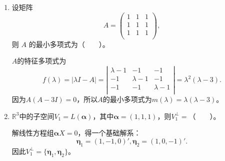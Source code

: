 \begin{enumerate}[1~]
\begin{enumerate}[1.~]
\begin{remark}
接下来回到以上命题：

\begin{proof}
把$A$看成复矩阵，据 \eqref{fujuzhenxiangsiyuduijiaozhen} 得，$A \sim B$，其中$B$是上三角矩阵，$B$的主对角元为$\lambda_1, \lambda_2, \dots, \lambda_n$。据 \eqref{bansuiduijiaohua} 得，$A^* \sim B^*$。直接计算可得\[
B ^ { * } = \left( \begin{array} { c c c c } { \lambda _ { 2 } \lambda _ { 3 } \cdots \lambda _ { n } } & { c _ { 12 } } & { \cdots } & { c _ { 1 n } } \\ { 0 } & { \lambda _ { 1 } \lambda _ { 3 } \cdots \lambda _ { n } } & { \cdots } & { c _ { 2 n } } \\ { \vdots } & { \vdots } & { } & { \vdots } \\ { 0 } & { 0 } & { \cdots } & { \lambda _ { 1 } \lambda _ { 2 } \cdots \lambda _ { n - 1 } } \end{array} \right). \]
由于$|\lambda I -A^*| = |\lambda I -B^*|$，因此$A^*$的特征多项式在复数域中的全部根是：\[
\lambda _ { 2 } \lambda _ { 3 } \cdots \lambda _ { n } ,  \lambda _ { 1 } \lambda _ { 3 } \cdots \lambda _ { n } ,  \dots ,  \lambda _ { 1 } \lambda _ { 2 } \cdots \lambda _ { n - 1 }. \]
\end{proof}
\end{remark}

\item
设矩阵
$$
A = \left( \begin{matrix}
1&  1&  1\\
1&  1&  1\\
1&  1&  1\\
\end{matrix} \right),
$$
则 $A$ 的最小多项式为（\ \ \ \ ）。

\begin{solution}
$A$的特征多项式为\[
f(\lambda)=|\lambda I-A|=\left| \begin{matrix}
	\lambda -1&		-1&		-1\\
	-1&		\lambda -1&		-1\\
	-1&		-1&		\lambda -1\\
\end{matrix} \right|=\lambda ^2\left( \lambda -3 \right).
\]
因为$A(A-3I)=0$，所以$A$的最小多项式为$m(\lambda)=\lambda(\lambda-3)$。
\end{solution}

\item
$\mathbb{R}^3$中的子空间$V_1 =L(\boldsymbol{\alpha})$，其中$\boldsymbol{\alpha} =\left(1,1,1\right)$，则$V_1^{\bot} = $（\ \ \ \ ）。
\begin{solution}
解线性方程组$\boldsymbol{\alpha} X=0$，得一个基础解系：\[
\boldsymbol{\eta}_1=(1, -1, 0)', \boldsymbol{\eta}_2=(1, 0, -1)'.
\]
因此$V_1^{\bot}=\{\boldsymbol{\eta}_1, \boldsymbol{\eta}_2\}$。
\end{solution}


\end{enumerate}
\end{enumerate}
